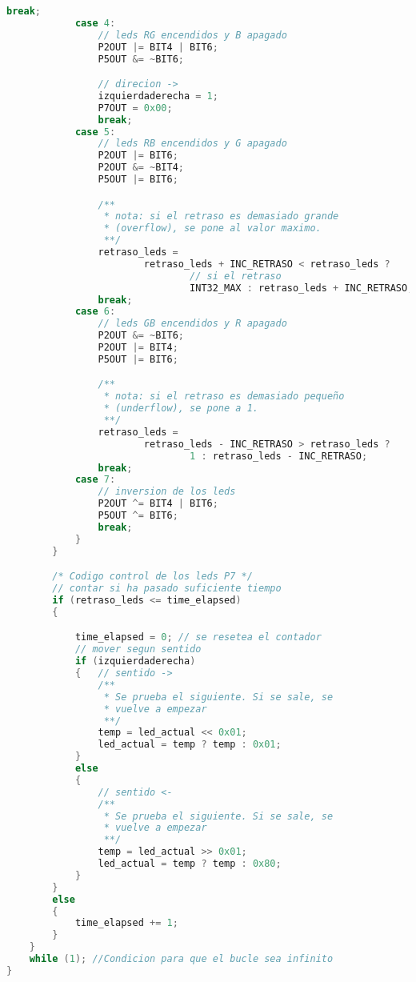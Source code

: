 \documentclass[12pt,a4paper]{article}
\begin{document}
\begin{lstlisting}[language=C]
                break;
            case 4:
                // leds RG encendidos y B apagado
                P2OUT |= BIT4 | BIT6;
                P5OUT &= ~BIT6;

                // direcion ->
                izquierdaderecha = 1;
                P7OUT = 0x00;
                break;
            case 5:
                // leds RB encendidos y G apagado
                P2OUT |= BIT6;
                P2OUT &= ~BIT4;
                P5OUT |= BIT6;

                /**
                 * nota: si el retraso es demasiado grande
                 * (overflow), se pone al valor maximo.
                 **/
                retraso_leds =
                        retraso_leds + INC_RETRASO < retraso_leds ?
                                // si el retraso
                                INT32_MAX : retraso_leds + INC_RETRASO;
                break;
            case 6:
                // leds GB encendidos y R apagado
                P2OUT &= ~BIT6;
                P2OUT |= BIT4;
                P5OUT |= BIT6;

                /**
                 * nota: si el retraso es demasiado pequeño
                 * (underflow), se pone a 1.
                 **/
                retraso_leds =
                        retraso_leds - INC_RETRASO > retraso_leds ?
                                1 : retraso_leds - INC_RETRASO;
                break;
            case 7:
                // inversion de los leds
                P2OUT ^= BIT4 | BIT6;
                P5OUT ^= BIT6;
                break;
            }
        }

        /* Codigo control de los leds P7 */
        // contar si ha pasado suficiente tiempo
        if (retraso_leds <= time_elapsed)
        {

            time_elapsed = 0; // se resetea el contador
            // mover segun sentido
            if (izquierdaderecha)
            {   // sentido ->
                /**
                 * Se prueba el siguiente. Si se sale, se
                 * vuelve a empezar
                 **/
                temp = led_actual << 0x01;
                led_actual = temp ? temp : 0x01;
            }
            else
            {
                // sentido <-
                /**
                 * Se prueba el siguiente. Si se sale, se
                 * vuelve a empezar
                 **/
                temp = led_actual >> 0x01;
                led_actual = temp ? temp : 0x80;
            }
        }
        else
        {
            time_elapsed += 1;
        }
    }
    while (1); //Condicion para que el bucle sea infinito
}
\end{lstlisting}
\end{document}
